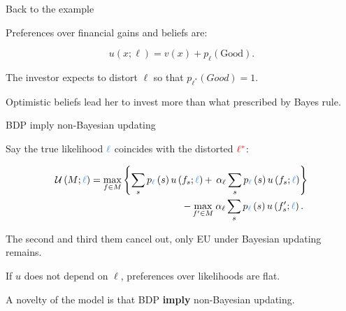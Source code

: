 \documentclass[usenames,dvipsnames,aspectratio=169,11pt]{beamer}
\begin{document}
\begin{frame}{Back to the example}
\begin{table}[H]
\begin{minipage}{0.45\textwidth}
\begin{tikzpicture}[x=0.75pt,y=0.75pt,yscale=-1,xscale=1]
			\end{tikzpicture}
		\end{minipage}
	\end{table}

	\vfill

	Preferences over financial gains and beliefs are:

	\vfill

	\[
		u \left( x; \ell \right) = v \left( x \right) + p_{\ell} \left( \text{Good} \right).
	\] \pause

	\vfill

	The investor expects to distort \( \ell \) so that \( p_{\ell^{*}} \left( Good \right) = 1 \).

	\vfill

	Optimistic beliefs lead her to invest more than what prescribed by Bayes rule.
\end{frame}

\begin{frame}{BDP imply non-Bayesian updating}

	Say the true likelihood \( \textcolor{RoyalBlue}{\ell} \) coincides with the distorted \( \textcolor{red}{\ell^{*}} \):

	\vfill

	\[
		\begin{aligned}
			\mathcal{U} \left(M ; \textcolor{RoyalBlue}{\ell} \right) = \max _{f \in M}\left\{\sum_{s} p_{\textcolor{RoyalBlue}{\ell}} \left( s \right) u \left( f_{s} ; \textcolor{RoyalBlue}{\ell} \right) + \right. & \left. \alpha_{\ell} \sum_{s} p_{\textcolor{RoyalBlue}{\ell}} \left( s \right) u \left( f_{s} ; \textcolor{RoyalBlue}{\ell} \right) \right\} \\
			-\max _{f^{\prime} \in M}                                                                                                                                                                                  & \: \alpha _{\ell} \sum_{s} p_{\textcolor{RoyalBlue}{\ell}} \left( s \right) u\left(f^{\prime}_{s} ; \textcolor{RoyalBlue}{\ell} \right) .
		\end{aligned}
	\]

	\vfill

	The second and third them cancel out, only EU under Bayesian updating remains. \pause

	\vfill

	If \( u \) does not depend on \( \ell \), preferences over likelihoods are flat.

	\vfill
	A novelty of the model is that BDP \textbf{imply} non-Bayesian updating.

\end{frame}
\end{document}

